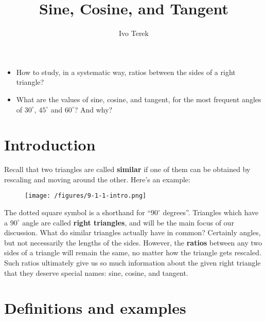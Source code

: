\documentclass{ximera}
\author{Ivo Terek}
\title{Sine, Cosine, and Tangent}
\begin{document}
\begin{abstract}
  
\end{abstract}
\maketitle



\begin{motivatingQuestions}\begin{itemize}
\item How to study, in a systematic way, ratios between the sides of a right triangle?
\item What are the values of sine, cosine, and tangent, for the most frequent angles of $30^\circ$, $45^\circ$ and $60^\circ$? And why?
\end{itemize}\end{motivatingQuestions}



\section{Introduction}

Recall that two triangles are called {\bf similar} if one of them can be obtained by rescaling and moving around the other. Here's an example:

\begin{figure}[h]
  \centering
  \texttt{[image: /figures/9-1-1-intro.png]}
\end{figure}

The dotted square symbol is a shorthand for ``$90^\circ$ degrees''. Triangles which have a $90^\circ$ angle are called {\bf right triangles}, and will be the main focus of our discussion. What do similar triangles actually have in common? Certainly angles, but not necessarily the lengths of the sides. However, the {\bf ratios} between any two sides of a triangle will remain the same, no matter how the triangle gets rescaled. Such ratios ultimately give us so much information about the given right triangle that they deserve special names: sine, cosine, and tangent.


\section{Definitions and examples}
\end{document}

